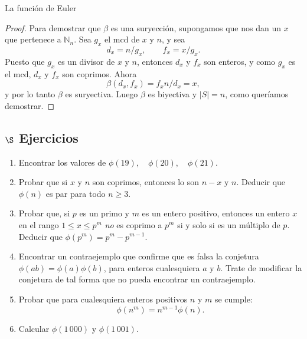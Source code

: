 \begin{section}{La función de Euler}
\begin{proof}
Para demostrar que $\beta$ es una suryección, supongamos que nos dan un $x$ que pertenece a $\mathbb N_n$. Sea $g_x$ el mcd de $x$ y $n$, y sea
$$
d_x = n/g_x, \qquad f_x = x /g_x.
$$
Puesto que $g_x$ es un divisor de $x$ y $n$, entonces $d_x$ y $f_x$ son enteros, y como $g_x$ es el mcd, $d_x$ y $f_x$ son coprimos. Ahora
$$
\beta(d_x,f_x) = f_x n/d_x = x,
$$
y por lo tanto $\beta$ es suryectiva.  Luego $\beta$ es biyectiva y $|S|=n$, como queríamos demostrar.
\end{proof}

\subsection*{$\S$ Ejercicios}
\begin{enumerate}
\item Encontrar los valores de $\phi(19),\quad \phi(20),\quad \phi(21)$.

\item Probar que si $x$ y $n$ son coprimos, entonces lo son $n-x$ y $n$. Deducir que $\phi(n)$ es par para todo $n \ge 3$.

\item Probar que, si $p$ es un primo y $m$ es un entero positivo, entonces un entero $x$ en el rango $1 \le x \le p^m$ \textit{no} es coprimo a $p^m$ si y solo si es un múltiplo de $p$. Deducir que $\phi(p^m) = p^m - p^{m-1}$.

\item Encontrar un contraejemplo que confirme que es falsa la conjetura $\phi(ab)= \phi(a)\phi(b)$, para enteros cualesquiera $a$ y $b$. Trate de modificar la conjetura de tal forma que no pueda
encontrar un contraejemplo. 

\item Probar que para cualesquiera enteros positivos $n$ y $m$ se cumple: 
$$
\phi(n^m) =n^{m-1}\phi(n).
$$

\item Calcular $\phi(1\,000)$ y $\phi(1\,001)$.
\end{enumerate}

\end{section}




